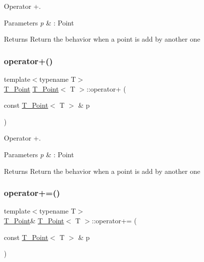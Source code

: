 Operator +. 


\begin{DoxyParams}{Parameters}
{\em p} & \+: Point \\
\hline
\end{DoxyParams}
\begin{DoxyReturn}{Returns}
Return the behavior when a point is add by another one 
\end{DoxyReturn}
\mbox{\label{classT__Point_a1f94a7a19cc8711e7784f700ea59297a}} 
\subsubsection{\texorpdfstring{operator+()}{operator+()}\hspace{0.1cm}{\footnotesize\ttfamily [2/2]}}
{\footnotesize\ttfamily template$<$typename T$>$ \\
\hyperlink{classT__Point}{T\+\_\+\+Point} \hyperlink{classT__Point}{T\+\_\+\+Point}$<$ T $>$\+::operator+ (\begin{DoxyParamCaption}\item[{const \hyperlink{classT__Point}{T\+\_\+\+Point}$<$ T $>$ \&}]{p }\end{DoxyParamCaption})\hspace{0.3cm}{\ttfamily [inline]}}



Operator +. 


\begin{DoxyParams}{Parameters}
{\em p} & \+: Point \\
\hline
\end{DoxyParams}
\begin{DoxyReturn}{Returns}
Return the behavior when a point is add by another one 
\end{DoxyReturn}
\mbox{\label{classT__Point_a4fa7b8ceb837c81e608d5ddad0f1ffe7}} 
\subsubsection{\texorpdfstring{operator+=()}{operator+=()}\hspace{0.1cm}{\footnotesize\ttfamily [1/2]}}
{\footnotesize\ttfamily template$<$typename T$>$ \\
\hyperlink{classT__Point}{T\+\_\+\+Point}\& \hyperlink{classT__Point}{T\+\_\+\+Point}$<$ T $>$\+::operator+= (\begin{DoxyParamCaption}\item[{const \hyperlink{classT__Point}{T\+\_\+\+Point}$<$ T $>$ \&}]{p }\end{DoxyParamCaption})\hspace{0.3cm}{\ttfamily [inline]}}



